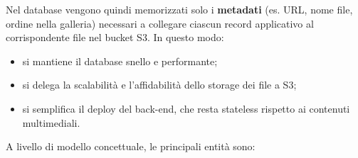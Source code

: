 \documentclass[a4paper,11pt]{report}
\begin{document}
Nel database vengono quindi memorizzati solo i \textbf{metadati} (es. URL, nome file, ordine nella galleria) necessari a collegare ciascun record applicativo al corrispondente file nel bucket S3. In questo modo:

\begin{itemize}[nosep]
  \item si mantiene il database snello e performante;
  \item si delega la scalabilità e l’affidabilità dello storage dei file a S3;
  \item si semplifica il deploy del back-end, che resta stateless rispetto ai contenuti multimediali.
\end{itemize}

A livello di modello concettuale, le principali entità sono:
\end{document}
